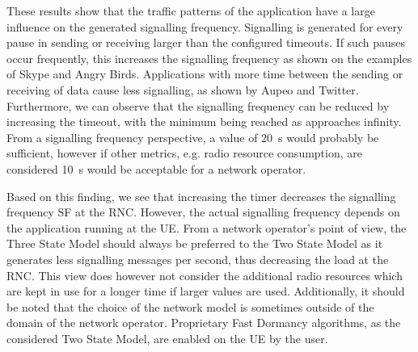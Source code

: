 These results show that the traffic patterns of the application have a large influence on the generated signalling frequency.
Signalling is generated for every pause in sending or receiving larger than the configured timeouts.
If such pauses occur frequently, this increases the signalling frequency as shown on the examples of Skype and Angry Birds.
Applications with more time between the sending or receiving of data cause less signalling, as shown by Aupeo and Twitter.
Furthermore, we can observe that the signalling frequency can be reduced by increasing the \TDCH timeout, with the minimum being reached as \TDCH approaches infinity.
From a signalling frequency perspective, a value of \SI{20}{\second} would probably be sufficient, however if other metrics, e.g. radio resource consumption, are considered \SI{10}{\second} would be acceptable for a network operator.

Based on this finding, we see that increasing the \TDCH timer decreases the signalling frequency \gls{SF} at the \gls{RNC}.
However, the actual signalling frequency depends on the application running at the \gls{UE}.
From a network operator's point of view, the Three State Model should always be preferred to the Two State Model as it generates less signalling messages per second, thus decreasing the load at the \gls{RNC}.
This view does however not consider the additional radio resources which are kept in use for a longer time if larger \TDCH values are used.
Additionally, it should be noted that the choice of the network model is sometimes outside of the domain of the network operator.
Proprietary Fast Dormancy algorithms, as the considered Two State Model, are enabled on the \gls{UE} by the user.

